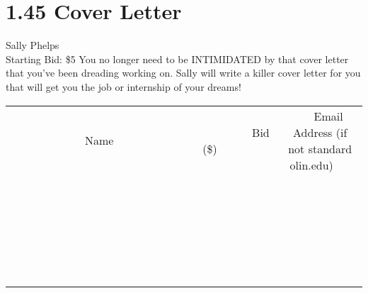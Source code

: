 \documentclass[11pt]{article}
\begin{document}
\section*{1.45 Cover Letter}
Sally Phelps
\\
Starting Bid: \$5
\newline
You no longer need to be INTIMIDATED by that cover letter that you've been dreading working on.  Sally will write a killer cover letter for you that will get you the job or internship of your dreams!
\\[6ex]
\begin{tabular}{c c c}
~~~~~~~~~~~~~Name~~~~~~~~~~~~~ & ~~~~~~~~~Bid (\$)~~~~~~~~~  & ~~~Email Address (if not standard olin.edu)~~~\\
 & & \\
\hline
 & & \\
\hline
 & & \\
\hline
 & & \\
\hline
 & & \\
\hline
 & & \\
\hline
 & & \\
\hline
 & & \\
\hline
 & & \\
\hline
 & & \\
\hline
 & & \\
\hline
 & & \\
\hline
 & & \\
\hline
 & & \\
\hline
 & & \\
\hline
 & & \\
\hline
 & & \\
\hline
 & & \\
\hline
 & & \\
\hline
 & & \\
\hline
 & & \\
\hline
 & & \\
\hline
 & & \\
\hline
 & & \\
\hline
 & & \\
\hline
 & & \\
\hline
\end{tabular}
\newpage
\end{document}

